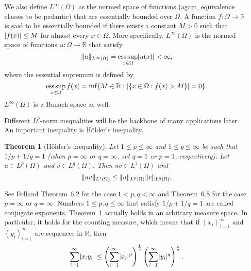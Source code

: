 \documentclass[english, 12pt, a4paper, sci, utf8, a-2b, online]{aaltothesis}
\theoremstyle{definition}
\theoremstyle{plain}
\newtheorem{theorem}{Theorem}[section]
\DeclarePairedDelimiter\abs{\lvert}{\rvert}
\DeclarePairedDelimiter\norm{\lVert}{\rVert}
\DeclareMathOperator*{\esssup}{ess\,sup}
\numberwithin{equation}{section}
\begin{document}
We also define $L^{\infty}(\Omega)$ as the normed space of functions
(again, equivalence classes to be pedantic) that are essentially bounded
over $\Omega$. A function $f: \Omega \to \mathbb{R}$ is said to be
essentially bounded
if there exists a constant $M > 0$ such that $\abs{f(x)} \leq M$
for almost every $x \in \Omega$. More specifically, $L^{\infty}(\Omega)$
is the normed space of functions $u: \Omega \to \mathbb{R}$ that satisfy
\begin{equation*}
    \norm{u}_{L^{\infty}(\Omega)}
    = \esssup_{x \in \Omega} \abs{u(x)}
    < \infty,
\end{equation*}
where the essential supremum is defined by
\begin{equation*}
    \esssup_{x \in \Omega} f(x)
    = \inf \{ M \in \mathbb{R} : \abs{\{ x \in \Omega : f(x) > M \}} = 0 \}.
\end{equation*}
$L^{\infty}(\Omega)$ is a Banach space as well.

Different $L^p$-norm inequalities will be the backbone of many applications
later. An important inequality is Hölder's inequality.
\begin{theorem}[Hölder's inequality]
    \label{thm:höldersineq}
    Let $1 \leq p \leq \infty$ and $1 \leq q \leq \infty$ be
    such that $1/p + 1/q = 1$
    (when $p=\infty$ or $q=\infty$, set $q=1$ or $p=1$, respectively).
    Let $u \in L^p(\Omega)$ and $v \in L^q(\Omega)$. Then $uv \in L^1(\Omega)$ and
    \begin{equation*}
        \norm{uv}_{L^1(\Omega)} \leq \norm{u}_{L^p(\Omega)} \norm{v}_{L^q(\Omega)}.
    \end{equation*}
\end{theorem}
See Folland \cite{folland1999} Theorem~6.2 for the case $1<p,q<\infty$
and Theorem~6.8 for the case $p=\infty$ or $q=\infty$.
Numbers $1 \leq p,q \leq \infty$ that satisfy $1/p + 1/q = 1$
are called conjugate exponents. Theorem~\ref{thm:höldersineq} actually
holds in an arbitrary measure space. In particular, it holds for the
counting measure, which means that if $(x_i)_{i=1}^{\infty}$
and $(y_i)_{i=1}^{\infty}$ are sequences in $\mathbb{R}$, then
\begin{equation*}
    \sum_{i=1}^{\infty} \abs{x_i y_i}
    \leq \left( \sum_{i=1}^{\infty} \abs{x_i}^p \right)^{\frac{1}{p}}
        \left( \sum_{i=1}^{\infty} \abs{y_i}^q \right)^{\frac{1}{q}}.
\end{equation*}
\end{document}
